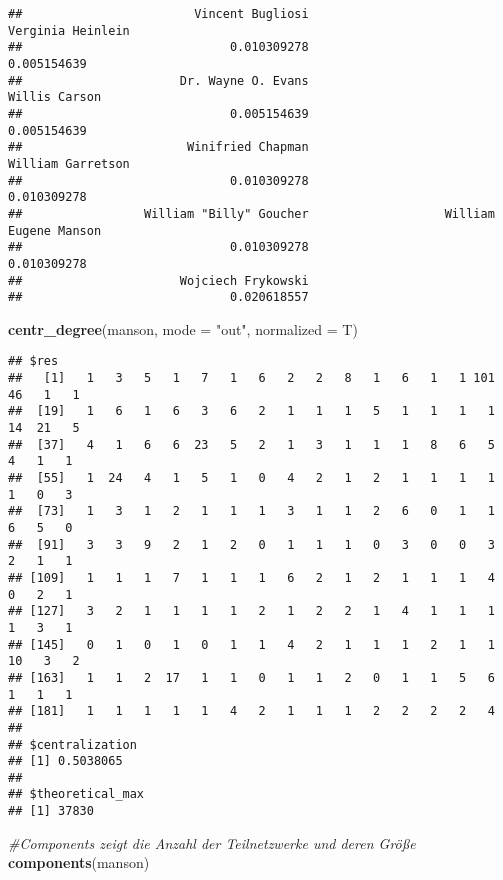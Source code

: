 \documentclass[
]{article}
\newenvironment{Shaded}{\begin{snugshade}}{\end{snugshade}}
\newcommand{\CommentTok}[1]{\textcolor[rgb]{0.56,0.35,0.01}{\textit{#1}}}
\newcommand{\DataTypeTok}[1]{\textcolor[rgb]{0.13,0.29,0.53}{#1}}
\newcommand{\KeywordTok}[1]{\textcolor[rgb]{0.13,0.29,0.53}{\textbf{#1}}}
\newcommand{\NormalTok}[1]{#1}
\newcommand{\StringTok}[1]{\textcolor[rgb]{0.31,0.60,0.02}{#1}}
\begin{document}
\begin{verbatim}
##                        Vincent Bugliosi                       Verginia Heinlein 
##                             0.010309278                             0.005154639 
##                      Dr. Wayne O. Evans                           Willis Carson 
##                             0.005154639                             0.005154639 
##                       Winifried Chapman                       William Garretson 
##                             0.010309278                             0.010309278 
##                 William "Billy" Goucher                   William Eugene Manson 
##                             0.010309278                             0.010309278 
##                      Wojciech Frykowski 
##                             0.020618557
\end{verbatim}

\begin{Shaded}
\begin{Highlighting}[]
\KeywordTok{centr_degree}\NormalTok{(manson, }\DataTypeTok{mode =} \StringTok{"out"}\NormalTok{, }\DataTypeTok{normalized =}\NormalTok{ T)}
\end{Highlighting}
\end{Shaded}

\begin{verbatim}
## $res
##   [1]   1   3   5   1   7   1   6   2   2   8   1   6   1   1 101  46   1   1
##  [19]   1   6   1   6   3   6   2   1   1   1   5   1   1   1   1  14  21   5
##  [37]   4   1   6   6  23   5   2   1   3   1   1   1   8   6   5   4   1   1
##  [55]   1  24   4   1   5   1   0   4   2   1   2   1   1   1   1   1   0   3
##  [73]   1   3   1   2   1   1   1   3   1   1   2   6   0   1   1   6   5   0
##  [91]   3   3   9   2   1   2   0   1   1   1   0   3   0   0   3   2   1   1
## [109]   1   1   1   7   1   1   1   6   2   1   2   1   1   1   4   0   2   1
## [127]   3   2   1   1   1   1   2   1   2   2   1   4   1   1   1   1   3   1
## [145]   0   1   0   1   0   1   1   4   2   1   1   1   2   1   1  10   3   2
## [163]   1   1   2  17   1   1   0   1   1   2   0   1   1   5   6   1   1   1
## [181]   1   1   1   1   1   4   2   1   1   1   2   2   2   2   4
## 
## $centralization
## [1] 0.5038065
## 
## $theoretical_max
## [1] 37830
\end{verbatim}

\begin{Shaded}
\begin{Highlighting}[]
\CommentTok{#Components zeigt die Anzahl der Teilnetzwerke und deren Größe}
\KeywordTok{components}\NormalTok{(manson)}
\end{Highlighting}
\end{Shaded}
\end{document}
